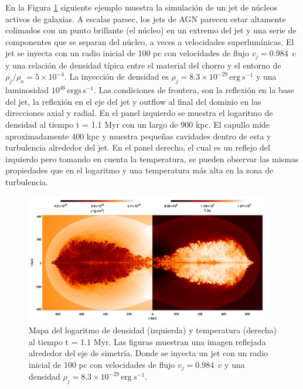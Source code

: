 \documentclass[12pt,a4paper]{book}
\begin{document}
{\color{blue} En la Figura \ref{fig:jet_agn} siguiente ejemplo muestra la simulación de un jet de núcleos activos de galaxias. A escalas parsec, los jets de AGN parecen estar altamente colimados con un punto brillante 
(el núcleo) en un extremo del jet y una serie de componentes que se separan del núcleo, a veces a velocidades superlumínicas. El jet se inyecta con un radio inicial de 100 pc con velocidades de flujo 
$v_j = 0.984$~c  y una relación de densidad típica entre el material del chorro y el entorno de $\rho_j / \rho_a = 5\times10^{-4}$. La inyección de densidad es $\rho_j = 8.3 \times 10^{-29} \, \text{erg}\,s^{-1}$ y una 
luminosidad $10^{46} \, \text{ergs} \, \text{s}^{-1}$. Las condiciones de frontera, son la reflexión en la base del jet, la reflexión en el eje del jet y outflow al final del dominio en las direcciones axial y radial.
En el panel izquierdo se muestra el logaritmo de densidad al tiempo t = 1.1 Myr con un largo de 900 kpc. El capullo mide aproximadamente 400 kpc y muestra pequeñas cavidades dentro de esta y turbulencia alrededor del jet.
En el panel derecho, el cual es un reflejo del izquierdo pero tomando en cuenta la temperatura, se pueden observar las mismas propiedades que en el logaritmo y una temperatura más alta en la zona de turbulencia.}



\begin{figure}
  \begin{center}
    \includegraphics[width=0.95\textwidth]{Figuras/Introduccion/jet_agn.png}
  \end{center}
  \caption{Mapa del logaritmo de densidad (izquierda) y temperatura (derecha) al tiempo t = 1.1 Myr. Las figuras muestran una imagen reflejada alrededor del eje de simetría. Donde se inyecta un jet con un radio inicial de 100 pc 
  con velocidades de flujo $v_j = 0.984$~c y una densidad $\rho_j = 8.3 \times 10^{-29} \, \text{erg}\,s^{-1}$.}
  \label{fig:jet_agn}
\end{figure}
\end{document}
